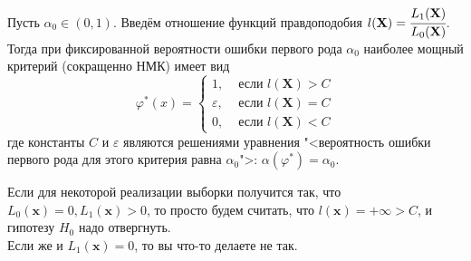 \begin{namedthm}
    Пусть $\alpha_{0} \in(0, 1)$.
    Введём отношение функций правдоподобия $l(\mathbf{X}) = \cfrac{L_{1}(\mathbf{X})}{L_{0}(\mathbf{X})}$.
    Тогда при фиксированной вероятности ошибки первого рода $\alpha_{0}$ наиболее мощный критерий (сокращенно НМК) имеет вид
    \begin{equation*}
        \varphi^{*}(x) = \begin{cases}
            1, & \text { если } l(\mathbf{X}) > C \\
            \varepsilon, & \text { если } l(\mathbf{X}) = C \\
            0, & \text { если } l(\mathbf{X}) < C
        \end{cases}
    \end{equation*}
    где константы $C$ и $\varepsilon$ являются решениями уравнения "<вероятность ошибки первого рода для этого критерия равна $\alpha_0$">: 
    $\alpha\left(\varphi^{*}\right)=\alpha_{0}$.
\end{namedthm}

\begin{rmrk}
    Если для некоторой реализации выборки получится так, что $L_0(\boldsymbol{x}) = 0, L_1(\boldsymbol{x}) > 0$,
    то просто будем считать, что $l(\boldsymbol{x}) = +\infty > C$, и гипотезу $H_0$ надо отвергнуть.\\
    Если же и $L_1(\boldsymbol{x}) = 0$, то вы что-то делаете не так.
\end{rmrk}

